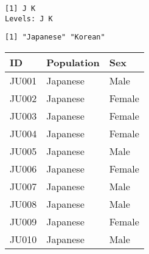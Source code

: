 \documentclass[
  letterpaper,
  DIV=11,
  numbers=noendperiod]{scrartcl}
\newenvironment{Shaded}{\begin{snugshade}}{\end{snugshade}}
\newcommand{\DecValTok}[1]{\textcolor[rgb]{0.68,0.00,0.00}{#1}}
\newcommand{\FunctionTok}[1]{\textcolor[rgb]{0.28,0.35,0.67}{#1}}
\newcommand{\NormalTok}[1]{\textcolor[rgb]{0.00,0.23,0.31}{#1}}
\newcommand{\OtherTok}[1]{\textcolor[rgb]{0.00,0.23,0.31}{#1}}
\newcommand{\SpecialCharTok}[1]{\textcolor[rgb]{0.37,0.37,0.37}{#1}}
\newcommand{\StringTok}[1]{\textcolor[rgb]{0.13,0.47,0.30}{#1}}
\begin{document}
\begin{verbatim}
[1] J K
Levels: J K
\end{verbatim}

\begin{Shaded}
\end{Shaded}

\begin{verbatim}
[1] "Japanese" "Korean"  
\end{verbatim}

\begin{Shaded}
\end{Shaded}

\begin{longtable}[]{@{}lll@{}}
\toprule()
ID & Population & Sex \\
\midrule()
\endhead
JU001 & Japanese & Male \\
JU002 & Japanese & Female \\
JU003 & Japanese & Female \\
JU004 & Japanese & Female \\
JU005 & Japanese & Male \\
JU006 & Japanese & Female \\
JU007 & Japanese & Male \\
JU008 & Japanese & Male \\
JU009 & Japanese & Female \\
JU010 & Japanese & Male \\
\bottomrule()
\end{longtable}
\end{document}
